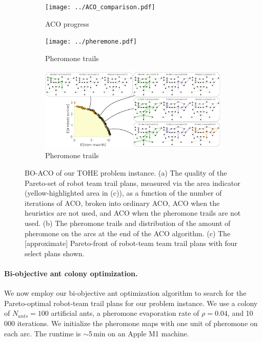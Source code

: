 \documentclass[11pt, oneside]{article}
\begin{document}
\begin{figure}[h!]
    \centering
     \begin{subfigure}[b]{0.39\textwidth}
    	\texttt{[image: ../ACO\_comparison.pdf]}
	\caption{ACO progress} \label{fig:aco_progress}
    \end{subfigure}
    \begin{subfigure}[b]{0.59\textwidth}
    	\texttt{[image: ../pheremone.pdf]}
	\caption{Pheromone trails} \label{fig:pheromone}
    \end{subfigure}
        \begin{subfigure}[b]{\textwidth}
    	\includegraphics[width=\textwidth]{drawings/real_pareto_front.pdf}
	\caption{Pheromone trails} \label{fig:pareto_front}
    \end{subfigure}
    \caption{BO-ACO of our TOHE problem instance. 
    (a) The quality of the Pareto-set of robot team trail plans, measured via the area indicator (yellow-highlighted area in (c)), as a function of the number of iterations of ACO, broken into ordinary ACO, ACO when the heuristics are not used, and ACO when the pheromone trails are not used.
    (b) The pheromone trails and distribution of the amount of pheromone on the arcs at the end of the ACO algorithm. 
    (c) The [approximate] Pareto-front of robot-team team trail plans with four select plans shown.
    }
\end{figure}

\paragraph{Bi-objective ant colony optimization.}
We now employ our bi-objective ant optimization algorithm to search for the Pareto-optimal robot-team trail plans for our problem instance.
We use a colony of $N_{ants}=100$ artificial ants, a pheromone evaporation rate of $\rho=0.04$, and 10\,000 iterations. We initialize the pheromone maps with one unit of pheromone on each arc.
The runtime is $\sim$5\,min on an Apple M1 machine.
\end{document}
